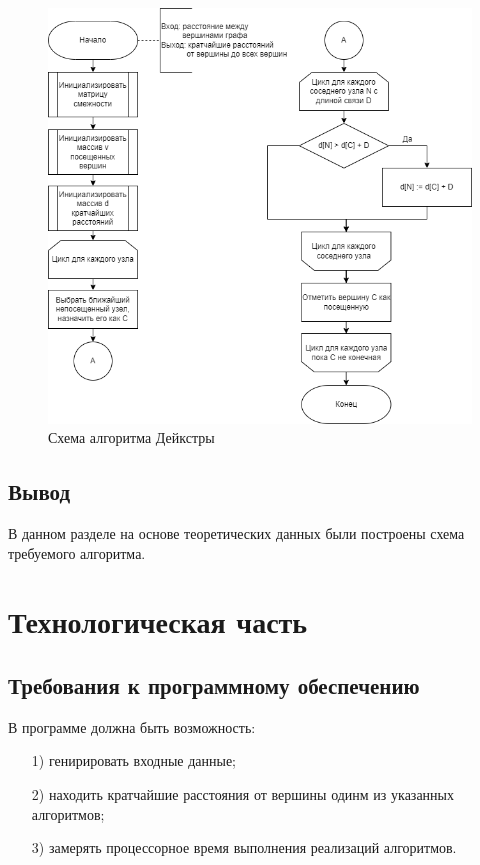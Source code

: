 \documentclass[a4paper,14pt, unknownkeysallowed]{extreport}
\begin{document}
\begin{figure}[h!]
	\centering
	\includegraphics[width=0.95\linewidth]{img/dijkstra.png}
	\caption{Схема алгоритма Дейкстры}
	\label{fig:dijkstra}
\end{figure}

\section*{Вывод}
	
В данном разделе на основе теоретических данных были построены схема требуемого алгоритма.
	
\chapter{Технологическая часть}
	
\section{Требования к программному обеспечению}
	
В программе должна быть возможность:
	
\begin{enumerate}
	\item[1)] генирировать входные данные;
	\item[2)] находить кратчайшие расстояния от вершины одинм из указанных алгоритмов;
	\item[3)] замерять процессорное время выполнения реализаций алгоритмов.
\end{enumerate}
	
\end{document}
